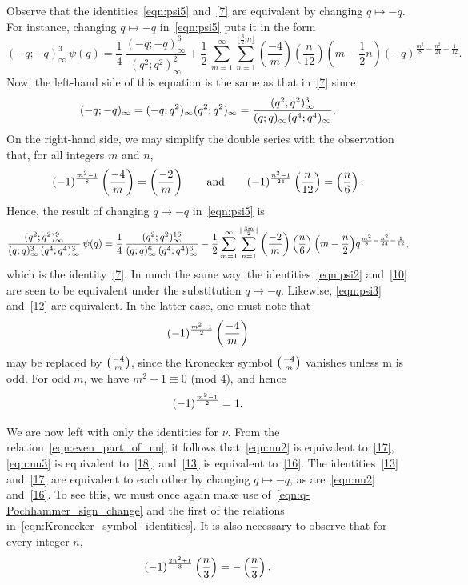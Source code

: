 \documentclass[11pt,reqno]{amsart}
\renewcommand{\=}{\;=\;}
\theoremstyle{myremark}
\begin{document}
Observe that the identities~\eqref{eqn:psi5} and~\ref{7} are equivalent by changing $q \mapsto -q$. For instance, changing $q \mapsto -q$ in~\eqref{eqn:psi5} puts it in the form
\[ (-q;-q)_\infty^3\,\psi(q)=\frac{1}{4}\,\frac{(-q;-q)_\infty^6}{(q^2;q^2)_\infty^2}+\frac{1}{2}\,\sum_{m=1}^\infty\sum_{n=1}^{\lfloor \frac{3}{2}m \rfloor}\left(\frac{-4}{m}\right)\left(\frac{n}{12}\right)\left(m-\frac{1}{2}n\right)(-q)^{\frac{m^2}{8}-\frac{n^2}{24}-\frac{1}{12}}. \]
Now, the left-hand side of this equation is the same as that in~\ref{7} since
\begin{equation} \label{eqn:q-Pochhammer_sign_change}
(-q;-q)_\infty = (-q;q^2)_\infty (q^2;q^2)_\infty = {(q^2;q^2)_\infty^3 \over (q;q)_\infty (q^4;q^4)_\infty}.
\end{equation}
On the right-hand side, we may simplify the double series with the observation that, for all integers $m$ and $n$,
\begin{equation} \label{eqn:Kronecker_symbol_identities}
(-1)^{m^2-1 \over 8}\left( {-4 \over m} \right) = \left( {-2 \over m} \right) \qquad \text{and} \qquad (-1)^{n^2-1 \over 24} \left( {n \over 12} \right) = \left( {n \over 6} \right).
\end{equation}
Hence, the result of changing $q \mapsto -q$ in~\eqref{eqn:psi5} is
\[ \frac{(q^2;q^2)_\infty^9}{(q;q)_\infty^3\,(q^4;q^4)_\infty^3}\,\psi(q)=\frac{1}{4}\,\frac{(q^2;q^2)_\infty^{16}}{(q;q)_\infty^6\,(q^4;q^4)_\infty^6}-{1 \over 2}\sum_{m=1}^\infty \sum_{n=1}^{\lfloor {3m \over 2} \rfloor} \left( {-2 \over m} \right) \left( {n \over 6} \right) \Big( m - {n \over 2} \Big) q^{{m^2 \over 8} - {n^2 \over 24} - {1 \over 12}}, \]
which is the identity~\ref{7}. 
In much the same way, the identities~\eqref{eqn:psi2} and~\ref{10} are seen to be equivalent under the substitution $q \mapsto -q$. 
Likewise, \eqref{eqn:psi3} and~\ref{12} are equivalent. 
In the latter case, one must note that
\[ (-1)^{{m^2 -1} \over 2} \left( {-4 \over m} \right) \]
may be replaced by $\left({-4\over m}\right)$, since the Kronecker symbol $\left({-4\over m}\right)$ vanishes unless m is odd. For odd $m$, we have $m^2-1 \equiv 0$ (mod $4$), and hence
\[
(-1)^{{m^2 -1} \over 2} =1.
\]

We are now left with only the identities for $\nu$. 
From the relation~\eqref{eqn:even_part_of_nu}, it follows that~\eqref{eqn:nu2} is equivalent to~\ref{17}, \eqref{eqn:nu3} is equivalent to~\ref{18}, and~\ref{13} is equivalent to~\ref{16}. The identities~\ref{13} and~\ref{17} are equivalent to each other by changing $q \mapsto -q$, as are~\eqref{eqn:nu2} and~\ref{16}. 
To see this, we must once again make use of~\eqref{eqn:q-Pochhammer_sign_change} and the first of the relations in~\eqref{eqn:Kronecker_symbol_identities}. 
It is also necessary to observe that for every integer $n$,
\[ (-1)^{2n^2+1 \over 3} \left({n \over 3}\right) = -\left({n \over 3}\right). \]
\end{document}
